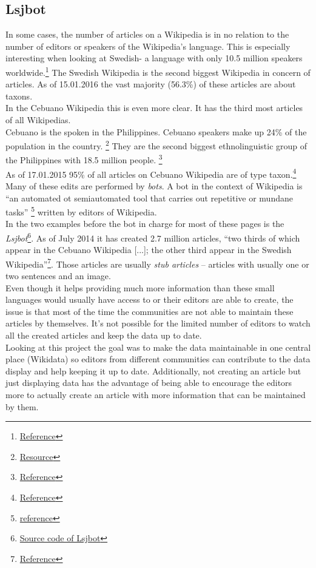 \subsection{Lsjbot}
In some cases, the number of articles on a Wikipedia is in no relation to the number of editors or speakers of the Wikipedia's language. This is especially interesting when looking at Swedish- a language with only 10.5 million speakers worldwide.\footnote{\href{http://www.npld.eu/about-us/swedish/}{Reference}} The Swedish Wikipedia is the second biggest Wikipedia in concern of articles. As of 15.01.2016 the vast majority (56.3\%) of these articles are about taxons. \\
In the Cebuano Wikipedia this is even more clear. It has the third most articles of all Wikipedias. \\
Cebuano is the spoken in the Philippines. Cebuano speakers make up 24\% of the population in the country. \footnote{\href{https://terpconnect.umd.edu/~oard/pdf/hlt03.pdf}{Resource}} They are the second biggest ethnolinguistic group of the Philippines with 18.5 million people. \footnote{\href{http://www.britannica.com/topic/Cebuano-language}{Reference}} \\
As of 17.01.2015 95\% of all articles on Cebuano Wikipedia are of type taxon.\footnote{\href{https://www.wikidata.org/wiki/Wikidata:Statistics/Wikipedia}{Reference}} \\
Many of these edits are performed by \textit{bots}. A bot in the context of Wikipedia is ``an automated ot semiautomated tool that carries out repetitive or mundane tasks'' \footnote{\href{https://en.wikipedia.org/w/index.php?title=Wikipedia:Bots&oldid=662582073}{reference}} written by editors of Wikipedia. \\
In the two examples before the bot in charge for most of these pages is the \textit{Lsjbot}\footnote{\href{https://sv.wikipedia.org/wiki/Wikipedia:Projekt_DotNetWikiBot_Framework/Lsjbot/Makespecies}{Source code of Lsjbot}}. As of July 2014 it has created 2.7 million articles, ``two thirds of which appear in the Cebuano Wikipedia [...]; the other third appear in the Swedish Wikipedia''\footnote{\href{https://en.wikipedia.org/wiki/Lsjbot}{Reference}}. Those articles are usually \textit{stub articles} -- articles with usually one or two sentences and an image. \\
Even though it helps providing much more information than these small languages would usually have access to or their editors are able to create, the issue is that most of the time the communities are not able to maintain these articles by themselves. It's not possible for the limited number of editors to watch all the created articles and keep the data up to date. \\
Looking at this project the goal was to make the data maintainable in one central place (Wikidata) so editors from different communities can contribute to the data display and help keeping it up to date. Additionally, not creating an article but just displaying data has the advantage of being able to encourage the editors more to actually create an article with more information that can be maintained by them. 

